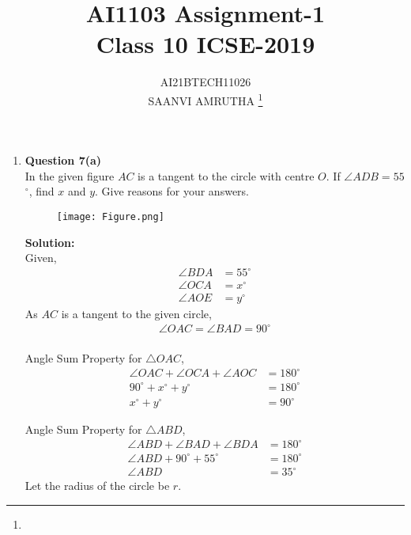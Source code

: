 \documentclass[journal,12pt,twocolumn]{IEEEtran}
\begin{document}
\let\vec\mathbf
\renewcommand{\thefigure}{\theproblem}
\def\putbox#1#2#3{\makebox[0in][l]{\makebox[#1][l]{}\raisebox{\baselineskip}[0in][0in]{\raisebox{#2}[0in][0in]{#3}}}}
     \def\rightbox#1{\makebox[0in][r]{#1}}
     \def\centbox#1{\makebox[0in]{#1}}
     \def\topbox#1{\raisebox{-\baselineskip}[0in][0in]{#1}}
     \def\midbox#1{\raisebox{-0.5\baselineskip}[0in][0in]{#1}}
\vspace{3cm}
\title{AI1103 Assignment-1\\Class 10 ICSE-2019}
\author{AI21BTECH11026\\SAANVI AMRUTHA
	\thanks{}
}
\maketitle
\newpage
\bigskip
\begin{enumerate}[label=,ref=]
\item \textbf{Question 7(a)}\\ 
In the given figure $AC$ is a tangent to the circle with centre $O$. If $\angle$$ADB=55$$^{\circ}$, find $x$ and $y$. Give reasons for your answers.\\
\begin{figure}[h]
\texttt{[image: Figure.png]}
\label{Fig}
\end{figure}

\textbf{Solution:} \\
Given,\\
  \begin{align}
\angle BDA&=55^\circ \\ 
\angle OCA&=x^\circ\\
 \angle AOE&=y^\circ
 \end{align} 
As $AC$ is a tangent to the given circle, 
\begin{align} 
\angle OAC=\angle BAD=90^\circ
\end{align} 
\\
Angle Sum Property for $\triangle OAC$, 
        \begin{align}
           \angle OAC+\angle OCA+\angle AOC&=180^\circ \\
             90^\circ+x^\circ+y^\circ&=180^\circ\\
          x^\circ+y^\circ&=90^\circ
               \end{align} 
             
               
Angle Sum Property for $\triangle ABD$,    
\begin{align}
               \angle ABD+\angle BAD+\angle BDA&=180^\circ\\
               \angle ABD+90^\circ+55^\circ&=180^\circ\\
               \angle ABD&=35^\circ
 \end{align}  
 Let the radius of the circle be $r$.\\


\end{enumerate}
\end{document}
